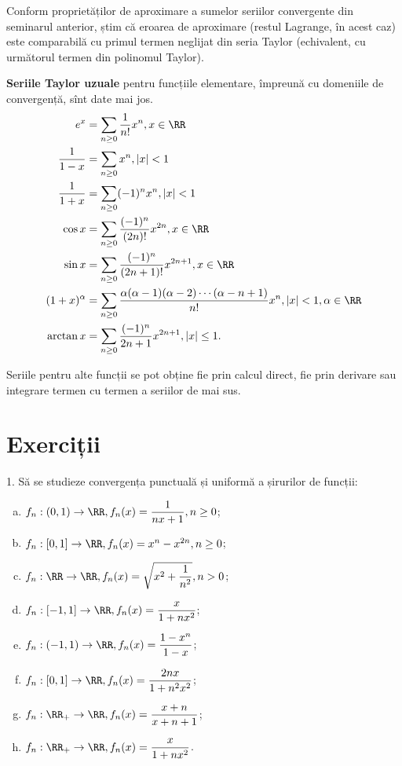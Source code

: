 \begin{remark}\label{rk:aprox}
  Conform proprietăților de aproximare a sumelor seriilor convergente din seminarul
  anterior, știm că eroarea de aproximare (restul Lagrange, în acest caz) este
  comparabilă cu primul termen neglijat din seria Taylor (echivalent, cu următorul
  termen din polinomul Taylor).
\end{remark}

\textbf{Seriile Taylor uzuale} pentru funcțiile elementare, împreună cu domeniile
de convergență, sînt date mai jos.
\begin{align*}
  e^x &= \sum_{n \geq 0} \dfrac{1}{n!} x^n, x \in \RR \\
  \dfrac{1}{1 - x} &= \sum_{n \geq 0} x^n, |x| < 1 \\
  \dfrac{1}{1 + x} &= \sum_{n \geq 0} (-1)^n x^n, |x| < 1 \\
  \cos x &= \sum_{n \geq 0} \dfrac{(-1)^n}{(2n)!} x^{2n}, x \in \RR \\
  \sin x &= \sum_{n \geq 0} \dfrac{(-1)^n}{(2n + 1)!} x^{2n + 1}, x \in \RR \\
  (1 + x)^\alpha &= \sum_{n \geq 0} \dfrac{\alpha(\alpha - 1)(\alpha - 2) \cdots (\alpha - n + 1)}{n!} x^n,%
                   |x| < 1, \alpha \in \RR \\
  \arctan x &= \sum_{n \geq 0} \dfrac{(-1)^n}{2n + 1} x^{2n + 1}, | x | \leq 1.
\end{align*}

Seriile pentru alte funcții se pot obține fie prin calcul direct, fie
prin derivare sau integrare termen cu termen a seriilor de mai sus.


\section{Exerciții}

1. Să se studieze convergența punctuală și uniformă a șirurilor de funcții:
\begin{enumerate}[(a)]
\item $ f_n : (0, 1) \to \RR, f_n(x) = \dfrac{1}{nx + 1}, n \geq 0 $;
\item $ f_n : [0, 1] \to \RR, f_n(x) = x^n - x^{2n}, n \geq 0 $;
\item $ f_n : \RR \to \RR, f_n(x) = \sqrt{x^2 + \dfrac{1}{n^2}}, n > 0 $;
\item $ f_n : [-1,1] \to \RR, f_n(x) = \dfrac{x}{1 + nx^2} $;
\item $ f_n : (-1, 1) \to \RR, f_n(x) = \dfrac{1 - x^n}{1 - x} $;
\item $ f_n : [0, 1] \to \RR, f_n(x) = \dfrac{2nx}{1 + n^2 x^2} $;
\item $ f_n : \RR_+ \to \RR, f_n(x) = \dfrac{x + n}{x + n + 1} $;
\item $ f_n : \RR_+ \to \RR, f_n(x) = \dfrac{x}{1 + nx^2} $.
\end{enumerate}

